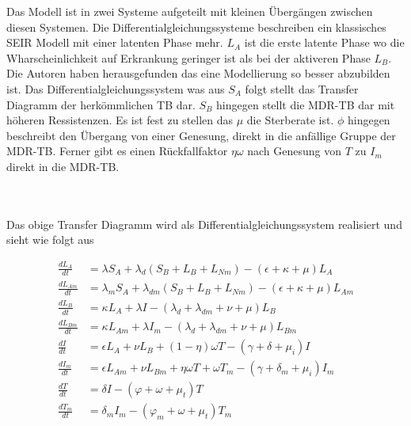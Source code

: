 \documentclass[paper=a4, fontsize=11pt, ngerman, abstract=on]{scrartcl}
\numberwithin{equation}{section} %
\numberwithin{figure}{section} %
\numberwithin{table}{section} %
\begin{document}
\begin{minipage}{0.55\linewidth}
Das Modell ist in zwei Systeme aufgeteilt mit kleinen Übergängen zwischen diesen Systemen. Die Differentialgleichungssysteme beschreiben ein klassisches SEIR Modell mit einer latenten Phase mehr. $L_{A}$ ist die erste latente Phase wo die Wharscheinlichkeit auf Erkrankung geringer ist als bei der aktiveren Phase $L_{B}$. Die Autoren haben herausgefunden das eine Modellierung so besser abzubilden ist. Das Differentialgleichungssystem was aus $S_{A}$ folgt stellt das Transfer Diagramm der herkömmlichen TB dar. $S_{B}$ hingegen stellt die MDR-TB dar mit höheren Ressistenzen. Es ist fest zu stellen das $\mu$ die Sterberate ist. $\phi$ hingegen beschreibt den Übergang von einer Genesung, direkt in die anfällige Gruppe der MDR-TB. Ferner gibt es einen Rückfallfaktor $\eta \omega$ nach Genesung von $T$ zu $I_{m}$ direkt in die MDR-TB.
\end{minipage}\\\\

Das obige Transfer Diagramm wird als Differentialgleichungssystem realisiert und sieht wie folgt aus

\begin{equation}
\begin{split}
  \frac{dL_{A}}{dt} &= \lambda S_{A} + \lambda_{d}(S_{B} + L_{B} + L_{Nm}) - (\epsilon + \kappa + \mu)L_{A} \\
  \frac{dL_{Am}}{dt} &= \lambda_{m} S_{A} + \lambda_{dm}(S_{B} + L_{B} + L_{Nm}) - (\epsilon + \kappa + \mu)L_{Am} \\
  \frac{dL_{B}}{dt} &= \kappa L_{A} + \lambda I - (\lambda_{d} + \lambda_{dm} + \nu + \mu) L_{B} \\
  \frac{dL_{Bm}}{dt} &= \kappa L_{Am} + \lambda I_{m} - (\lambda_{d} + \lambda _{dm} + \nu + \mu) L_{Bm} \\
  \frac{dI}{dt} &= \epsilon L_{A} + \nu L_{B} + (1 - \eta)\omega T - (\gamma + \delta + \mu_{i})I \\
  \frac{dI_{m}}{dt} &= \epsilon L_{Am} + \nu L_{Bm} + \eta \omega T + \omega T_{m} - (\gamma + \delta_{m} + \mu_{i})I_{m} \\
  \frac{dT}{dt} &= \delta I - (\varphi + \omega + \mu_{t}) T \\
  \frac{dT_{m}}{dt} &= \delta _{m} I_{m} - (\varphi _{m} + \omega + \mu_{t}) T_{m}
\end{split}
\label{eq:dgls-mdr-tb}
\end{equation}
\end{document}
